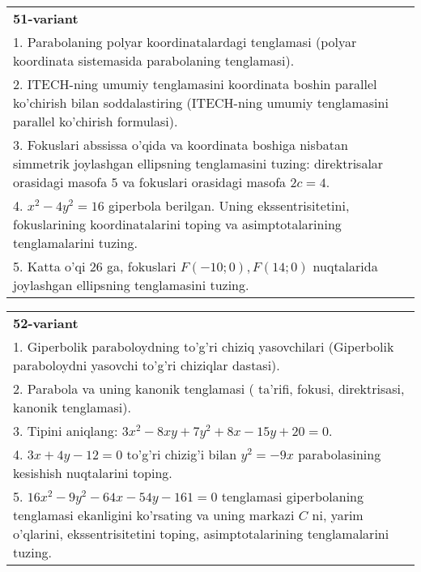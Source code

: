 \documentclass{article}
\begin{document}
\begin{tabular}{m{17cm}}
\textbf{51-variant}\\
1. Parabolaning polyar koordinatalardagi tenglamasi (polyar koordinata sistemasida parabolaning tenglamasi).\\

2. ITECH-ning umumiy tenglamasini koordinata boshin parallel ko'chirish bilan soddalastiring (ITECH-ning umumiy tenglamasini parallel ko'chirish formulasi).\\

3. Fokuslari abssissa o'qida va koordinata boshiga nisbatan simmetrik joylashgan ellipsning tenglamasini tuzing: direktrisalar orasidagi masofa $5$ va fokuslari orasidagi masofa $2c=4$.\\

4. $x^{2} - 4y^{2} = 16$ giperbola berilgan. Uning ekssentrisitetini, fokuslarining koordinatalarini toping va asimptotalarining tenglamalarini tuzing.\\

5. Katta o'qi 26 ga, fokuslari $F( - 10;0), F(14;0)$ nuqtalarida joylashgan ellipsning tenglamasini tuzing.  
\end{tabular}
\vspace{1cm}


\begin{tabular}{m{17cm}}
\textbf{52-variant}\\
1. Giperbolik paraboloydning to'g'ri chiziq yasovchilari (Giperbolik paraboloydni yasovchi to'g'ri chiziqlar dastasi).\\

2. Parabola va uning kanonik tenglamasi ( ta'rifi, fokusi, direktrisasi, kanonik tenglamasi).\\

3. Tipini aniqlang: $3x^{2}-8xy+7y^{2}+8x-15y+20=0$.\\

4. $3x + 4y - 12 = 0$ to'g'ri chizig'i bilan $y^{2} = - 9x$ parabolasining kesishish nuqtalarini toping.  \\

5. $16x^{2} - 9y^{2} - 64x - 54y - 161 = 0$ tenglamasi giperbolaning tenglamasi ekanligini ko'rsating va uning markazi $C$ ni, yarim o'qlarini, ekssentrisitetini toping, asimptotalarining tenglamalarini tuzing.  
\end{tabular}
\vspace{1cm}
\end{document}
